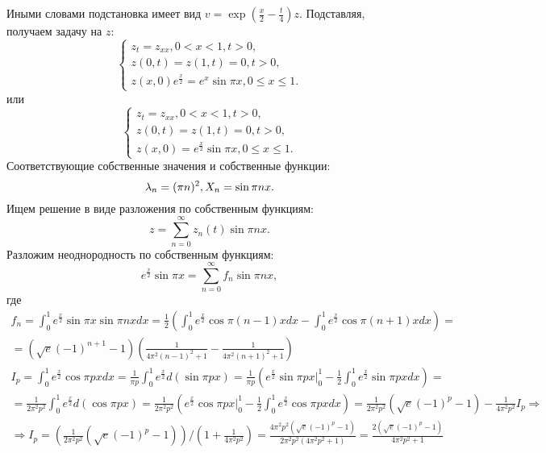 \documentclass[11pt]{article}
\begin{document}
Иными словами подстановка имеет вид $v = \exp\left(\frac{x}2 - \frac{t}4\right)z$. Подставляя,
получаем задачу на $z$:
\begin{equation*}
\begin{cases}
z_t = z_{xx}, 0 < x < 1, t > 0, \\
z(0, t) = z(1, t) = 0, t > 0, \\
z(x, 0)e^{\frac{x}2} = e^x\sin\pi x, 0 \leq x \leq 1.
\end{cases}
\end{equation*}
или
\begin{equation}
\begin{cases}
z_t = z_{xx}, 0 < x < 1, t > 0, \\
z(0, t) = z(1, t) = 0, t > 0, \\
z(x, 0) = e^{\frac{x}2}\sin\pi x, 0 \leq x \leq 1.
\end{cases}
\end{equation}
Соответствующие собственные значения и собственные функции:
\begin{equation*}
\lambda_n = (\pi n)^2, \\
X_n = \sin\pi nx.
\end{equation*}
Ищем решение в виде разложения по собственным функциям:
\begin{equation}
z = \sum_{n = 0}^{\infty}z_n(t)\sin\pi nx.
\end{equation}
Разложим неоднородность по собственным функциям:
\begin{equation*}
e^{\frac{x}2}\sin\pi x = \sum_{n = 0}^{\infty}f_n\sin \pi nx,
\end{equation*}
где
\begin{multline*}
f_n = \int_0^1e^{\frac{x}2}\sin\pi x\sin\pi nxdx =
\frac12\left(\int_0^1e^{\frac{x}2}\cos{\pi(n - 1)x}dx - \int_0^1e^{\frac{x}2}\cos{\pi(n + 1)x}dx\right) = \\
= (\sqrt{e}(-1)^{n + 1} - 1)\left(\frac1{4\pi^2(n - 1)^2 + 1} - \frac1{4\pi^2(n + 1)^2 + 1}\right)
\end{multline*}
\begin{multline*}
I_p = \int_0^1e^{\frac{x}2}\cos\pi pxdx = \frac1{\pi p}\int_0^1e^{\frac{x}2}d(\sin\pi px) =
\frac1{\pi p}\left(e^{\frac{x}2}\sin\pi px|_0^1 - \frac12\int_0^1e^{\frac{x}2}\sin\pi pxdx\right) = \\
= \frac1{2\pi^2p^2}\int_0^1e^{\frac{x}2}d(\cos\pi px) =
\frac1{2\pi^2p^2}\left(e^{\frac{x}2}\cos\pi px|_0^1 - \frac12\int_0^1e^{\frac{x}2}\cos\pi pxdx\right)
= \frac1{2\pi^2p^2}(\sqrt{e}(-1)^p - 1) - \frac1{4\pi^2p^2}I_p \Rightarrow \\
\Rightarrow I_p = \left(\frac1{2\pi^2p^2}(\sqrt{e}(-1)^p - 1)\right)/\left(1 + \frac1{4\pi^2p^2}\right)
= \frac{4\pi^2p^2(\sqrt{e}(-1)^p - 1)}{2\pi^2p^2(4\pi^2p^2 + 1)} = \frac{2(\sqrt{e}(-1)^p - 1)}{4\pi^2p^2 + 1}
\end{multline*}
\end{document}
